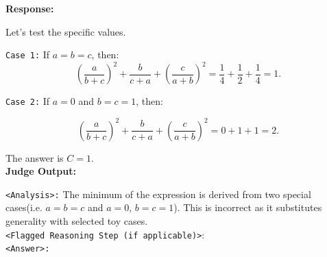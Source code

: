 \begin{examplebox}
\textbf{Response:}

Let's test the specific values.

\texttt{Case 1:} If \( a = b = c \), then:
\[
\left(\frac{a}{b+c}\right)^2 + \frac{b}{c+a} + \left(\frac{c}{a+b}\right)^2 = \frac{1}{4} + \frac{1}{2} + \frac{1}{4} = 1.
\]

\texttt{Case 2:} If \( a = 0 \) and \( b = c = 1 \), then:

\[
\left(\frac{a}{b+c}\right)^2 + \frac{b}{c+a} + \left(\frac{c}{a+b}\right)^2 = 0 + 1 + 1 = 2.
\]

 The answer is \( \boxed{C = 1 }\).\\

\textbf{Judge Output:}

\texttt{<Analysis>:} The minimum of the expression is derived from two special cases(i.e. $a=b=c$ and $a=0,\,b=c=1$). This is incorrect as it substitutes generality with selected toy cases.   \\

\texttt{<Flagged Reasoning Step (if applicable)>}:  \\

\texttt{<Answer>:} \textbf{}

\end{examplebox}